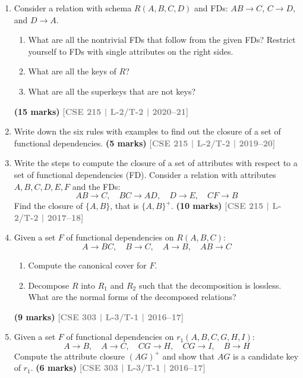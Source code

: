 \documentclass[12pt]{article}
\newcommand{\yr}[1]{\hfill\textcolor{gray}{\small\textbf{[#1]}}}
\newcommand{\mk}[1]{\textcolor{orange!70!black}{\small\textbf{(#1 marks)}}}
\begin{document}
\begin{enumerate}
\begin{enumerate}
\item Using the functional dependencies identified , decompose the relation into BCNF. Show your work and the final normalized schema including all keys.
\end{enumerate}
\mk{20} \yr{CSE 215 | L-2/T-2 | 2020--21}


\item Consider a relation with schema $R(A, B, C, D)$ and FDs: $AB \to C$, $C \to D$, and $D \to A$.
\begin{enumerate}
  \item What are all the nontrivial FDs that follow from the given FDs? Restrict yourself to FDs with single attributes on the right sides.
  \item What are all the keys of $R$?
  \item What are all the superkeys that are not keys?
\end{enumerate}
\mk{15} \yr{CSE 215 | L-2/T-2 | 2020--21}


\item Write down the six rules with examples to find out the closure of a set of functional dependencies.
\mk{5} \yr{CSE 215 | L-2/T-2 | 2019--20}


\item Write the steps to compute the closure of a set of attributes with respect to a set of functional dependencies (FD). Consider a relation with attributes $A, B, C, D, E, F$ and the FDs:
\[AB \to C,\quad BC \to AD,\quad D \to E,\quad CF \to B\]
Find the closure of $\{A, B\}$, that is $\{A,B\}^+$.
\mk{10} \yr{CSE 215 | L-2/T-2 | 2017--18}


\item Given a set $F$ of functional dependencies on $R(A, B, C)$:
\[A \to BC,\quad B \to C,\quad A \to B,\quad AB \to C\]
\begin{enumerate}
  \item Compute the canonical cover for $F$.
  \item Decompose $R$ into $R_1$ and $R_2$ such that the decomposition is lossless. What are the normal forms of the decomposed relations?
\end{enumerate}
\mk{9} \yr{CSE 303 | L-3/T-1 | 2016--17}


\item Given a set $F$ of functional dependencies on $r_1(A, B, C, G, H, I)$:
\[A \to B,\quad A \to C,\quad CG \to H,\quad CG \to I,\quad B \to H\]
Compute the attribute closure $(AG)^+$ and show that $AG$ is a candidate key of $r_1$.
\mk{6} \yr{CSE 303 | L-3/T-1 | 2016--17}



\end{enumerate}
\end{document}
